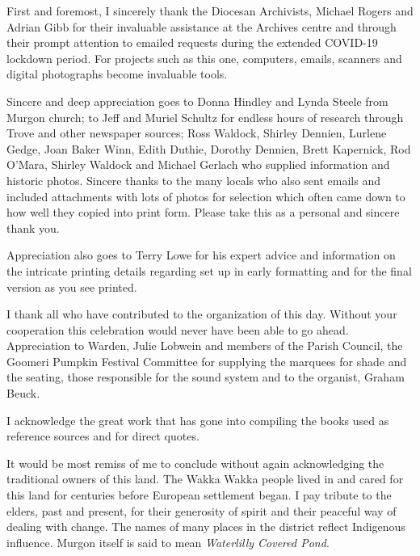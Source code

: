 First and foremost, I sincerely thank the Diocesan Archivists, Michael Rogers and Adrian Gibb for their invaluable assistance at the Archives centre and through their prompt attention to emailed requests during the extended COVID-19 lockdown period. For projects such as this one, computers, emails, scanners and digital photographs become invaluable tools.



Sincere and deep appreciation goes to Donna Hindley and Lynda Steele from Murgon church; to Jeff and Muriel Schultz for endless hours of research through Trove and other newspaper sources; Ross Waldock, Shirley Dennien, Lurlene Gedge, Joan Baker Winn, Edith Duthie, Dorothy Dennien, Brett Kapernick, Rod O'Mara, Shirley Waldock and Michael Gerlach who supplied information and historic photos. Sincere thanks to the many locals who also sent emails and included attachments with lots of photos for selection which often came down to how well they copied into print form. Please take this as a personal and sincere thank you.



Appreciation also goes to Terry Lowe for his expert advice and information on the intricate printing details regarding set up in early formatting and for the final version as you see printed.



I thank all who have contributed to the organization of this day. Without your cooperation this celebration would never have been able to go ahead. Appreciation to Warden, Julie Lobwein and members of the Parish Council, the Goomeri Pumpkin Festival Committee for supplying the marquees for shade and the seating, those responsible for the sound system and to the organist, Graham Beuck.



I acknowledge the great work that has gone into compiling the books used as reference sources and for direct quotes.



It would be most remiss of me to conclude without again acknowledging the traditional owners of this land. The Wakka Wakka people lived in and cared for this land for centuries before European settlement began. I pay tribute to the elders, past and present, for their generosity of spirit and their peaceful way of dealing with change. The names of many places in the district reflect Indigenous influence. Murgon itself is said to mean \emph{Waterlilly Covered Pond}.



